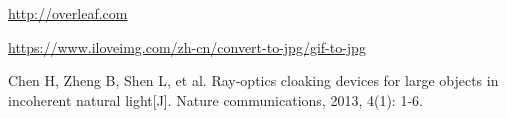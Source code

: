 \documentclass{article}
\begin{document}
\newpage
\begin{thebibliography}{9} %
  \url{http://overleaf.com}

  \url{https://www.iloveimg.com/zh-cn/convert-to-jpg/gif-to-jpg }

Chen H, Zheng B, Shen L, et al. Ray-optics cloaking devices for large objects in incoherent natural light[J]. Nature communications, 2013, 4(1): 1-6.

\end{thebibliography}
\end{document}
